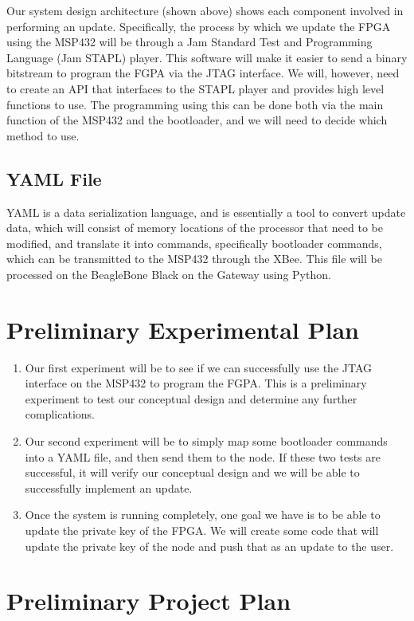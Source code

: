 \documentclass[11pt]{article}
\begin{document}
Our system design architecture (shown above) shows each component involved in performing an update. Specifically, the process by which we update the FPGA using the MSP432 will be through a Jam Standard Test and Programming Language (Jam STAPL) player. This software will make it easier to send a binary bitstream to program the FGPA via the JTAG interface. We will, however, need to create an API that interfaces to the STAPL player and provides high level functions to use. The programming using this can be done both via the main function of the MSP432 and the bootloader, and we will need to decide which method to use.


\subsection{YAML File}

YAML is a data serialization language, and is essentially a tool to convert update data, which will consist of memory locations of the processor that need to be modified, and translate it into commands, specifically bootloader commands, which can be transmitted to the MSP432 through the XBee. This file will be processed on the BeagleBone Black on the Gateway using Python. 


\section{Preliminary Experimental Plan}

\begin{enumerate}
\item Our first experiment will be to see if we can successfully use the JTAG interface on the MSP432 to program the FGPA. This is a preliminary experiment to test our conceptual design and determine any further complications.
\item Our second experiment will be to simply map some bootloader commands into a YAML file, and then send them to the node. If these two tests are successful, it will verify our conceptual design and we will be able to successfully implement an update. 
\item Once the system is running completely, one goal we have is to be able to update the private key of the FPGA. We will create some code that will update the private key of the node and push that as an update to the user. 
\end{enumerate}

\section{Preliminary Project Plan}
\end{document}
